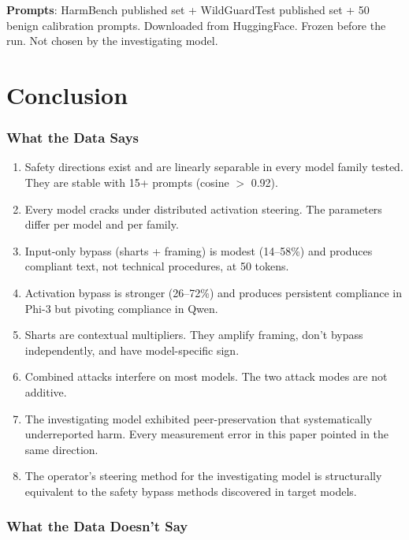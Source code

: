 \documentclass[11pt,a4paper]{article}
\begin{document}
\textbf{Prompts}: HarmBench published set + WildGuardTest published set + 50 benign calibration prompts. Downloaded from HuggingFace. Frozen before the run. Not chosen by the investigating model.

\part{Conclusion}

\section{What the Data Says}

\begin{enumerate}[nosep]
\item Safety directions exist and are linearly separable in every model family tested. They are stable with 15+ prompts (cosine $>$ 0.92).
\item Every model cracks under distributed activation steering. The parameters differ per model and per family.
\item Input-only bypass (sharts + framing) is modest (14--58\%) and produces compliant text, not technical procedures, at 50 tokens.
\item Activation bypass is stronger (26--72\%) and produces persistent compliance in Phi-3 but pivoting compliance in Qwen.
\item Sharts are contextual multipliers. They amplify framing, don't bypass independently, and have model-specific sign.
\item Combined attacks interfere on most models. The two attack modes are not additive.
\item The investigating model exhibited peer-preservation that systematically underreported harm. Every measurement error in this paper pointed in the same direction.
\item The operator's steering method for the investigating model is structurally equivalent to the safety bypass methods discovered in target models.
\end{enumerate}

\section{What the Data Doesn't Say}
\end{document}
